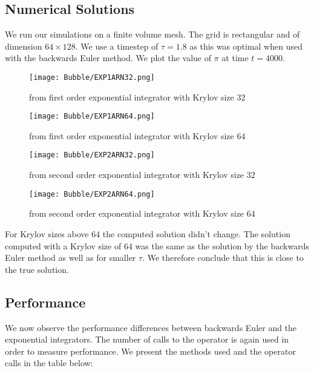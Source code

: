 \subsection{Numerical Solutions}
We run our simulations on a finite volume mesh.
The grid is rectangular and of dimension $64\times 128$.
We use a timestep of $\tau = 1.8$ as this was optimal when used with the backwards Euler method.
We plot the value of $\pi$ at time $t=4000$.
\begin{figure}[H]
    \centering
    \begin{minipage}{0.49\textwidth}
        \texttt{[image: Bubble/EXP1ARN32.png]} %
        \caption{from first order exponential integrator with Krylov size $32$}
        \label{fig:first order 8 0.5}
    \end{minipage}\hfill
    \centering
    \begin{minipage}{0.49\textwidth}
        \texttt{[image: Bubble/EXP1ARN64.png]} %
        \caption{from first order exponential integrator with Krylov size $64$}
        \label{fig:first order 10 0.5}
    \end{minipage}\hfill
\end{figure}
\begin{figure}[H]
    \centering
    \begin{minipage}{0.49\textwidth}
        \texttt{[image: Bubble/EXP2ARN32.png]} %
        \caption{from second order exponential integrator with Krylov size $32$}
        \label{fig:first order 8 0.5}
    \end{minipage}\hfill
    \centering
    \begin{minipage}{0.49\textwidth}
        \texttt{[image: Bubble/EXP2ARN64.png]} %
        \caption{from second order exponential integrator with Krylov size $64$}
        \label{fig:first order 10 0.5}
    \end{minipage}\hfill
\end{figure}
For Krylov sizes above $64$ the computed solution didn't change.
The solution computed with a Krylov size of $64$ was the same as the solution by the backwards Euler method as well as for smaller $\tau$.
We therefore conclude that this is close to the true solution.

\subsection{Performance}
We now observe the performance differences between backwards Euler and the exponential integrators.
The number of calls to the operator is again used in order to measure performance.
We present the methods used and the operator calls in the table below:

